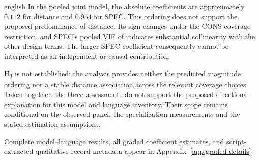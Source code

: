 \begin{otherlanguage*}{english}
In the pooled joint model, the absolute coefficients are approximately $0.112$ for distance and $0.954$ for SPEC. This ordering does not support the proposed predominance of distance. Its sign changes under the CONS-coverage restriction, and SPEC's pooled VIF of \GSpecVIF{} indicates substantial collinearity with the other design terms. The larger SPEC coefficient consequently cannot be interpreted as an independent or causal contribution.

H\textsubscript{3} is not established: the analysis provides neither the predicted magnitude ordering nor a stable distance association across the relevant coverage choices. Taken together, the three assessments do not support the proposed directional explanation for this model and language inventory. Their scope remains conditional on the observed panel, the specialization measurements and the stated estimation assumptions.

\end{otherlanguage*}

Complete model--language results, all graded coefficient estimates, and script-extracted qualitative record metadata appear in Appendix~\ref{app:graded-details}.
